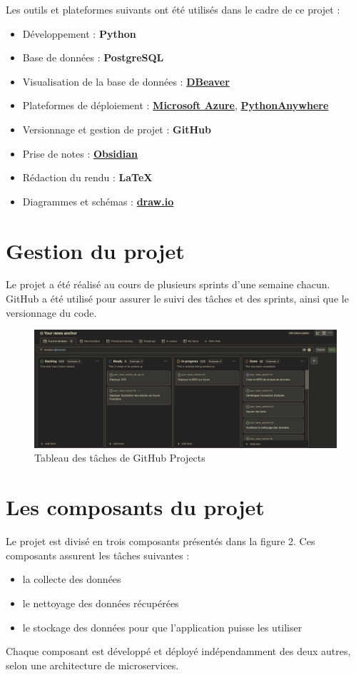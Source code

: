 \documentclass[french]{article}
\begin{document}
    Les outils et plateformes suivants ont été utilisés dans le cadre de ce projet :
    \begin{itemize}
        \item Développement : \textbf{Python}
        \item Base de données : \textbf{PostgreSQL}
        \item Visualisation de la base de données : \textbf{\href{https://dbeaver.io/}{DBeaver}}
        \item Plateformes de déploiement : \textbf{\href{https://azure.microsoft.com/fr-fr}{Microsoft Azure}}, \textbf{\href{https://www.pythonanywhere.com/}{PythonAnywhere}}
        \item Versionnage et gestion de projet : \textbf{GitHub}
        \item Prise de notes : \textbf{\href{https://obsidian.md/}{Obsidian}}
        \item Rédaction du rendu : \textbf{\LaTeX} 
        \item Diagrammes et schémas : \textbf{\href{https://app.diagrams.net/}{draw.io}}
    \end{itemize}
    
    \section{Gestion du projet}
    Le projet a été réalisé au cours de plusieurs sprints d'une semaine chacun. GitHub a été utilisé pour assurer le suivi des tâches et des sprints, ainsi que le versionnage du code.
    
    \begin{figure}[h]
        \includegraphics[width=12cm]{gh_projects}
        \centering
        \caption{Tableau des tâches de GitHub Projects}
        \centering
    \end{figure}

    \section{Les composants du projet}
    Le projet est divisé en trois composants présentés dans la figure 2. Ces composants assurent les tâches suivantes :
    \begin{itemize}
        \item la collecte des données
        \item le nettoyage des données récupérées
        \item le stockage des données pour que l'application puisse les utiliser
    \end{itemize}
    Chaque composant est développé et déployé indépendamment des deux autres, selon une architecture de microservices.
\end{document}
